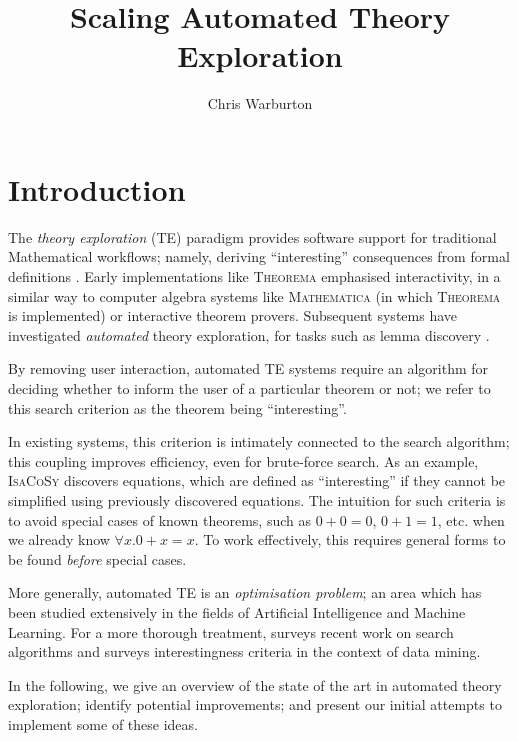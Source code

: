 \documentclass{eceasst}
\title{Scaling Automated Theory Exploration} %
\author{Chris Warburton\sponsor{}} %
\institute{ %
\email{cmwarburton@dundee.ac.uk}\\
School of Computing\\
University of Dundee}
\begin{document}
\maketitle

\section{Introduction}

The \emph{theory exploration} (TE) paradigm provides software support
for traditional Mathematical workflows; namely, deriving ``interesting''
consequences from formal definitions \cite{RISC1482}. Early
implementations like \textsc{Theorema} \cite{buchberger2000theory} emphasised
interactivity, in a similar way to computer algebra systems like
\textsc{Mathematica} (in which \textsc{Theorema} is implemented) or
interactive theorem provers. Subsequent systems have investigated
\emph{automated} theory exploration, for tasks such as lemma discovery
\cite{Hipster}.

By removing user interaction, automated TE systems require an algorithm
for deciding whether to inform the user of a particular theorem or not; we refer
to this search criterion as the theorem being ``interesting''.

In existing systems, this criterion is intimately connected to the
search algorithm; this coupling improves efficiency, even for brute-force
search. As an example, \textsc{IsaCoSy} \cite{johansson2009isacosy} discovers
equations, which are defined as ``interesting'' if they cannot be simplified
using previously discovered equations. The intuition for such criteria is to
avoid special cases of known theorems, such as $0 + 0 = 0$, $0 + 1 = 1$,
etc. when we already know $\forall x. 0 + x = x$. To work effectively, this
requires general forms to be found \emph{before} special cases.

More generally, automated TE is an \emph{optimisation problem}; an area which
has been studied extensively in the fields of Artificial Intelligence and
Machine Learning. For a more thorough treatment, \cite{geng2006interestingness}
surveys recent work on search algorithms and \cite{blum2011hybrid} surveys
interestingness criteria in the context of data mining.

In the following, we give an overview of the state of the art in automated
theory exploration; identify potential improvements; and present our initial
attempts to implement some of these ideas.
\end{document}
